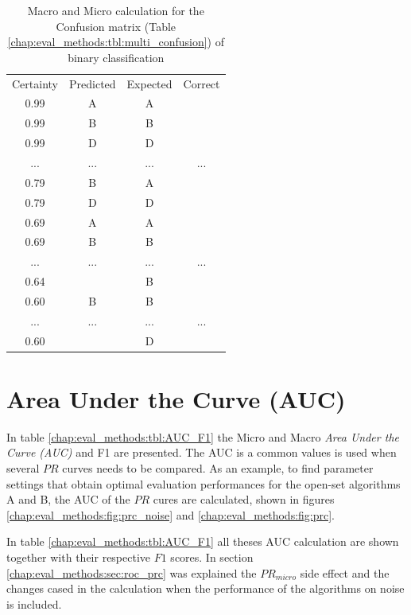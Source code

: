 \begin{table}[t]
	\center
	\caption{Macro and Micro calculation for the Confusion matrix (Table \ref{chap:eval_methods:tbl:multi_confusion}) of binary classification}\label{chap:eval_methods:tbl:prc}
	\begin{tabular}{|c|c|c|c|}
		\cline{1-4}
		Certainty & Predicted & Expected & Correct\\
		\cline{1-4}
		0.99 & A & A & \cmark \\
		0.99 & B & B & \cmark \\
		0.99 & D & D & \cmark \\
		... & ... & ... & ... \\
		0.79 & B & A & \xmark \\
		0.79 & D & D & \cmark \\
		0.69 & A & A & \xmark \\
		0.69 & B & B & \cmark \\
		... & ... & ... & ... \\
		0.64 & \emptyset & B & \xmark \\
		0.60 & B & B & \cmark \\
		... & ... & ... & ... \\
		0.60 & \emptyset & D & \xmark \\
		\cline{1-4}
	\end{tabular}
\end{table}



\section{Area Under the Curve (AUC)}\label{chap:eval_methods:sec:closed_set_classification} 

In table \ref{chap:eval_methods:tbl:AUC_F1} the Micro and Macro \textit{Area Under the Curve (AUC)} and F1 are presented. The AUC is a common values is used when several $PR$ curves needs to be compared. As an example, to find parameter settings that obtain optimal evaluation performances for the open-set algorithms A and B, the AUC of the $PR$ cures are calculated, shown in figures \ref{chap:eval_methods:fig:prc_noise} and \ref{chap:eval_methods:fig:prc}.

In table \ref{chap:eval_methods:tbl:AUC_F1} all theses AUC calculation are shown together with their respective $F1$ scores. In section \ref{chap:eval_methods:sec:roc_prc} was explained the $PR_{micro}$ side effect and the changes cased in the calculation when the performance of the algorithms on noise is included.


